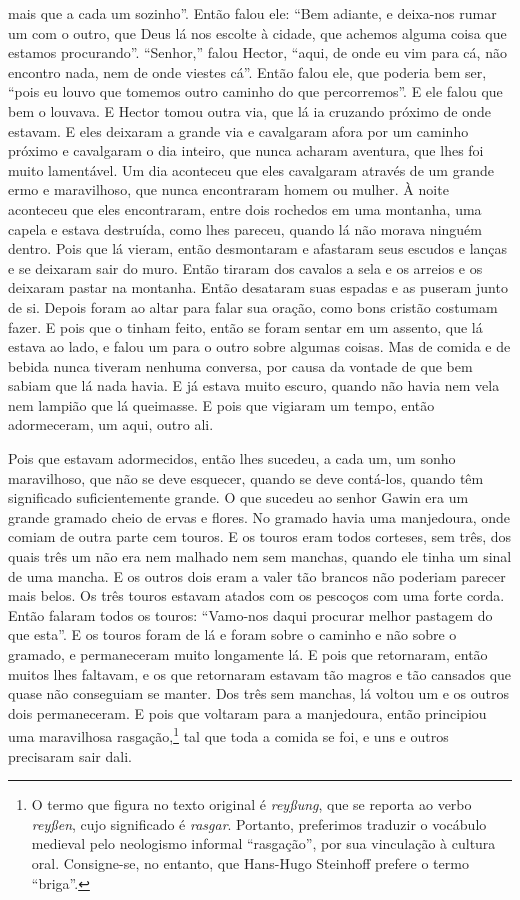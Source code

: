 mais que a cada um sozinho”. Então falou ele: “Bem adiante, e deixa-nos rumar
um com o outro, que Deus lá nos escolte à cidade, que achemos alguma coisa que
estamos procurando”. “Senhor,” falou Hector, “aqui, de onde eu vim para cá, não
encontro nada, nem de onde viestes cá”. Então falou ele, que poderia bem ser,
“pois eu louvo que tomemos outro caminho do que percorremos”. E ele falou que
bem o louvava. E Hector tomou outra via, que lá ia cruzando próximo de onde
estavam. E eles deixaram a grande via e cavalgaram afora por um caminho próximo
e cavalgaram o dia inteiro, que nunca acharam aventura, que lhes foi muito
lamentável. Um dia aconteceu que eles cavalgaram através de um grande ermo e
maravilhoso, que nunca encontraram homem ou mulher. À noite aconteceu que eles
encontraram, entre dois rochedos em uma montanha, uma capela e estava
destruída, como lhes pareceu, quando lá não morava ninguém dentro. Pois que lá
vieram, então desmontaram e afastaram seus escudos e lanças e se deixaram sair
do muro. Então tiraram dos cavalos a sela e os arreios e os deixaram pastar na
montanha. Então desataram suas espadas e as puseram junto de si. Depois foram
ao altar para falar sua oração, como bons cristão costumam fazer. E
pois que o tinham feito, então se foram sentar em um assento, que lá estava ao
lado, e falou um para o outro sobre algumas coisas. Mas de comida e de bebida
nunca tiveram nenhuma conversa, por causa da vontade de que bem sabiam que lá
nada havia. E já estava muito escuro, quando não havia nem vela nem lampião que
lá queimasse. E pois que vigiaram um tempo, então adormeceram, um aqui, outro
ali.

Pois que estavam adormecidos, então lhes sucedeu, a cada um, um sonho
maravilhoso, que não se deve esquecer, quando se deve contá-los, quando têm
significado suficientemente grande. O que sucedeu ao senhor Gawin era um grande
gramado cheio de ervas e flores. No gramado havia uma manjedoura, onde comiam
de outra parte cem touros. E os touros eram todos corteses, sem três, dos quais
três um não era nem malhado nem sem manchas, quando ele tinha um sinal de uma
mancha. E os outros dois eram a valer tão brancos não poderiam parecer mais
belos. Os três touros estavam atados com os pescoços com uma forte corda. Então
falaram todos os touros: “Vamo-nos daqui procurar melhor pastagem do que esta”.
E os touros foram de lá e foram sobre o caminho e não sobre o gramado, e
permaneceram muito longamente lá. E pois que retornaram, então muitos lhes
faltavam, e os que retornaram estavam tão magros e tão cansados que quase não
conseguiam se manter. Dos três sem manchas, lá voltou um e os outros dois
permaneceram. E pois que voltaram para a manjedoura, então principiou uma
maravilhosa rasgação,\footnote{ O termo que figura no texto original é
\textit{reyßung}, que se reporta ao verbo\textit{ reyßen},  cujo significado 
é \textit{rasgar}. Portanto,
preferimos traduzir o vocábulo medieval pelo neologismo informal “rasgação”,
por sua vinculação à cultura oral. Consigne-se, no entanto, que Hans-Hugo
Steinhoff prefere o termo “briga”.}  tal que
toda a comida se foi, e uns e outros precisaram sair dali. 

